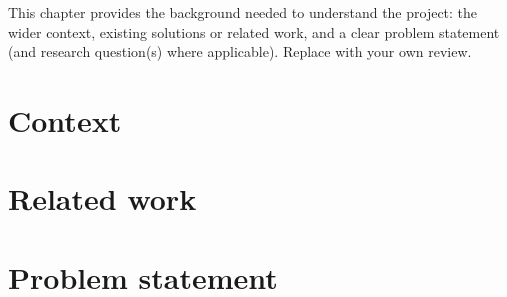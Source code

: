 %

This chapter provides the background needed to understand the project: the wider context, existing solutions or related work, and a clear problem statement (and research question(s) where applicable). Replace with your own review.

\lipsum[1-2]

\section{Context}\label{sec:context}

\lipsum[3-4]

\section{Related work}\label{sec:related}

\lipsum[5-6]

\section{Problem statement}\label{sec:problem}

\lipsum[7-8]
